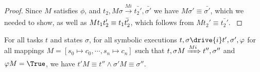 \begin{proof}
{{    Since $M$ satisfies $\phi$, and $t_2,M\sigma\xrightarrow[]{M i} \bar{t_2'},\bar{\sigma'}$ we have $M\sigma'\equiv\bar{\sigma'}$,
    which we needed to show, as well as $M t_1\relax t_2'\equiv t_1\relax \bar{t_2'}$, which follows from $M t_2' \equiv \bar{t_2'}$.}
  }

  {

  }
\end{proof}

\begin{lemma}
  \label{lem:sounddrive}

  For all tasks $t$ and states $\sigma$,
  for all symbolic executions $t,\sigma\drive{i} t',\sigma',\phi$
  for all mappings $M=[s_0\mapsto c_0,\cdots,s_n\mapsto c_n]$
  such that $t,\sigma M \xRightarrow[]{M i} t'',\sigma''$ and $\phi M = \True$,
  we have $t'M \equiv t'' \wedge \sigma' M \equiv \sigma''$.
\end{lemma}

